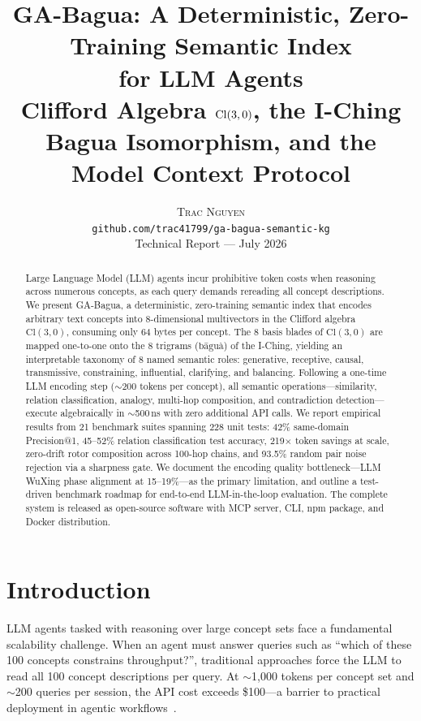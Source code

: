 \documentclass[11pt,a4paper]{article}
\title{\textbf{GA-Bagua: A Deterministic, Zero-Training Semantic Index\\for LLM Agents}\\[6pt]
       \large Clifford Algebra $\Cl(3,0)$, the I-Ching Bagua Isomorphism, and the Model Context Protocol}
\author{\textsc{Trac Nguyen}\\[2pt]
        \small\texttt{github.com/trac41799/ga-bagua-semantic-kg}\\[2pt]
        \small Technical Report — July 2026}
\date{}
\newcommand{\Cl}{\mathrm{Cl}}
\newcommand{\trigram}[1]{\text{#1}}
\begin{document}
\maketitle

\begin{abstract}
Large Language Model (LLM) agents incur prohibitive token costs when reasoning
across numerous concepts, as each query demands rereading all concept
descriptions. We present GA-Bagua, a deterministic, zero-training semantic
index that encodes arbitrary text concepts into 8-dimensional multivectors in
the Clifford algebra $\Cl(3,0)$, consuming only 64 bytes per concept. The 8
basis blades of $\Cl(3,0)$ are mapped one-to-one onto the 8 trigrams
($\trigram{b\={a}gu\`{a}}$) of the I-Ching, yielding an interpretable
taxonomy of 8 named semantic roles: generative, receptive, causal,
transmissive, constraining, influential, clarifying, and balancing. Following
a one-time LLM encoding step ($\sim$200 tokens per concept), all semantic
operations---similarity, relation classification, analogy, multi-hop
composition, and contradiction detection---execute algebraically in
$\sim$500\,ns with zero additional API calls. We report empirical results from
21 benchmark suites spanning 228 unit tests: 42\% same-domain Precision@1,
45--52\% relation classification test accuracy, 219$\times$ token savings at
scale, zero-drift rotor composition across 100-hop chains, and 93.5\% random
pair noise rejection via a sharpness gate. We document the encoding quality
bottleneck---LLM WuXing phase alignment at 15--19\%---as the primary
limitation, and outline a test-driven benchmark roadmap for end-to-end
LLM-in-the-loop evaluation. The complete system is released as open-source
software with MCP server, CLI, npm package, and Docker distribution.
\end{abstract}

\section{Introduction}

LLM agents tasked with reasoning over large concept sets face a fundamental
scalability challenge. When an agent must answer queries such as ``which of
these 100 concepts constrains throughput?'', traditional approaches force the
LLM to read all 100 concept descriptions per query. At $\sim$1,000 tokens per
concept set and $\sim$200 queries per session, the API cost exceeds \$100---a
barrier to practical deployment in agentic workflows~\cite{devlin2019bert}.
\end{document}
